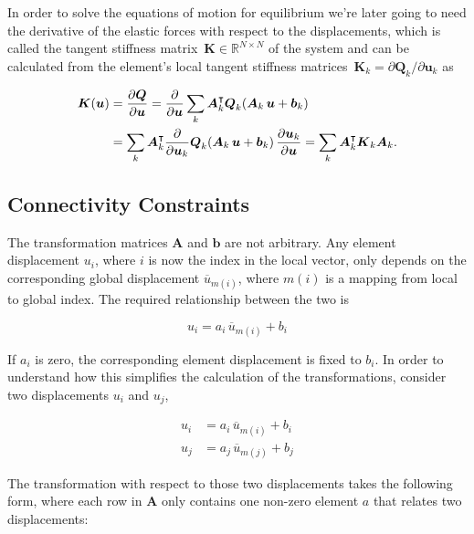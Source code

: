 In order to solve the equations of motion for equilibrium we're later going to need the derivative of the elastic forces with respect to the displacements, which is called the tangent stiffness matrix~$\boldsymbol{K} \in \mathbb{R}^{N \times N}$ of the system and can be calculated from the element's local tangent stiffness matrices~$\boldsymbol{K}_{k} = \partial \boldsymbol{Q}_{k} / \partial \boldsymbol{u}_{k}$ as

\begin{align}
\boldsymbol{K}(\boldsymbol{u}) &= \frac{\partial \boldsymbol{Q}}{\partial \boldsymbol{u}} = \frac{\partial}{\partial \boldsymbol{u}} \sum_{k} \boldsymbol{A}_{k}^\intercal\boldsymbol{Q}_{k}(\boldsymbol{A}_{k}\,\boldsymbol{u} + \boldsymbol{b}_{k}) \notag \\
&= \sum_{k} \boldsymbol{A}_{k}^\intercal \frac{\partial}{\partial \boldsymbol{u}_{k}}\boldsymbol{Q}_{k}(\boldsymbol{A}_{k}\,\boldsymbol{u} + \boldsymbol{b}_{k})\,\frac{\partial \boldsymbol{u}_{k}}{\partial \boldsymbol{u}} = \sum_{k} \boldsymbol{A}_{k}^\intercal \boldsymbol{K}_{k} \boldsymbol{A}_{k}.
\end{align}

\subsection{Connectivity Constraints}

The transformation matrices $\boldsymbol{A}$ and $\boldsymbol{b}$ are not arbitrary.
Any element displacement $u_{i}$, where $i$ is now the index in the local vector, only depends on the corresponding global displacement $\overline{u}_{m(i)}$, where $m(i)$ is a mapping from local to global index.
The required relationship between the two is

$$u_{i} = a_{i}\,\overline{u}_{m(i)} + b_{i}$$

If $a_{i}$ is zero, the corresponding element displacement is fixed to $b_{i}$.
In order to understand how this simplifies the calculation of the transformations, consider two displacements $u_{i}$ and $u_{j}$,

\begin{align*}
u_{i} &= a_{i}\,\overline{u}_{m(i)} + b_{i} \\
u_{j} &= a_{j}\,\overline{u}_{m(j)} + b_{j}
\end{align*}

The transformation with respect to those two displacements takes the following form, where each row in $\boldsymbol{A}$ only contains one non-zero element $a$ that relates two displacements:

